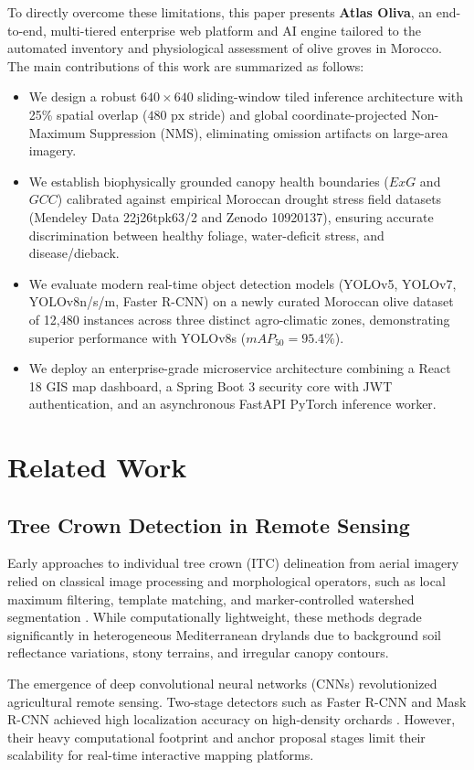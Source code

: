 \documentclass[runningheads]{llncs}
\begin{document}
To directly overcome these limitations, this paper presents \textbf{Atlas Oliva}, an end-to-end, multi-tiered enterprise web platform and AI engine tailored to the automated inventory and physiological assessment of olive groves in Morocco. The main contributions of this work are summarized as follows:
\begin{itemize}
    \item We design a robust $640 \times 640$ sliding-window tiled inference architecture with 25\% spatial overlap ($480\text{ px}$ stride) and global coordinate-projected Non-Maximum Suppression (NMS), eliminating omission artifacts on large-area imagery.
    \item We establish biophysically grounded canopy health boundaries ($ExG$ and $GCC$) calibrated against empirical Moroccan drought stress field datasets (Mendeley Data 22j26tpk63/2 and Zenodo 10920137), ensuring accurate discrimination between healthy foliage, water-deficit stress, and disease/dieback.
    \item We evaluate modern real-time object detection models (YOLOv5, YOLOv7, YOLOv8n/s/m, Faster R-CNN) on a newly curated Moroccan olive dataset of 12,480 instances across three distinct agro-climatic zones, demonstrating superior performance with YOLOv8s ($mAP_{50} = 95.4\%$).
    \item We deploy an enterprise-grade microservice architecture combining a React 18 GIS map dashboard, a Spring Boot 3 security core with JWT authentication, and an asynchronous FastAPI PyTorch inference worker.
\end{itemize}

\section{Related Work}
\subsection{Tree Crown Detection in Remote Sensing}
Early approaches to individual tree crown (ITC) delineation from aerial imagery relied on classical image processing and morphological operators, such as local maximum filtering, template matching, and marker-controlled watershed segmentation \cite{ref5,ref6}. While computationally lightweight, these methods degrade significantly in heterogeneous Mediterranean drylands due to background soil reflectance variations, stony terrains, and irregular canopy contours.

The emergence of deep convolutional neural networks (CNNs) revolutionized agricultural remote sensing. Two-stage detectors such as Faster R-CNN and Mask R-CNN achieved high localization accuracy on high-density orchards \cite{ref7}. However, their heavy computational footprint and anchor proposal stages limit their scalability for real-time interactive mapping platforms.
\end{document}
